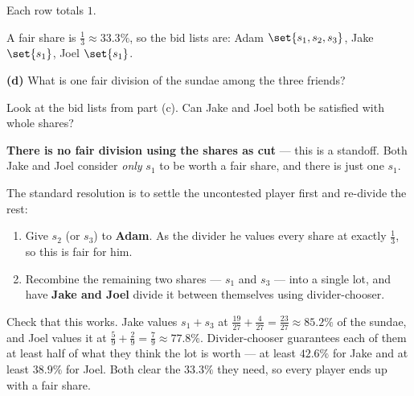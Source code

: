 \documentclass[12pt]{ximera}
\begin{document}
\begin{problem}
\begin{prompt}
\begin{solution}
Each row totals $1$. \checkmark

A fair share is $\frac13 \approx 33.3\%$, so the bid lists are: Adam $\set{s_1,s_2,s_3}$,
Jake $\set{s_1}$, Joel $\set{s_1}$.
\end{solution}
\end{prompt}

\begin{prompt}
\textbf{(d)} What is one fair division of the sundae among the three friends?

\begin{freeResponse}
\end{freeResponse}

\begin{hint}
Look at the bid lists from part (c). Can Jake and Joel both be satisfied with whole
shares?
\end{hint}

\begin{solution}
\textbf{There is no fair division using the shares as cut} --- this is a standoff. Both
Jake and Joel consider \emph{only} $s_1$ to be worth a fair share, and there is just one
$s_1$.

The standard resolution is to settle the uncontested player first and re-divide the
rest:
\begin{enumerate}
\item Give $s_2$ (or $s_3$) to \textbf{Adam}. As the divider he values every share at
      exactly $\frac13$, so this is fair for him.
\item Recombine the remaining two shares --- $s_1$ and $s_3$ --- into a single lot, and
      have \textbf{Jake and Joel} divide it between themselves using divider-chooser.
\end{enumerate}

Check that this works. Jake values $s_1 + s_3$ at
$\frac{19}{27}+\frac{4}{27} = \frac{23}{27} \approx 85.2\%$ of the sundae, and Joel
values it at $\frac59 + \frac29 = \frac79 \approx 77.8\%$. Divider-chooser guarantees
each of them at least half of what they think the lot is worth --- at least $42.6\%$ for
Jake and at least $38.9\%$ for Joel. Both clear the $33.3\%$ they need, so every player
ends up with a fair share.
\end{solution}
\end{prompt}
\end{problem}
\end{document}
